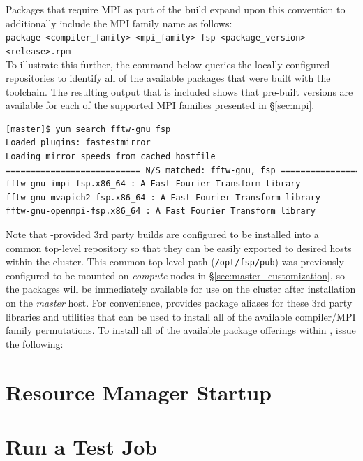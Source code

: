 \documentclass[letterpaper]{article}
\begin{document}
\noindent Packages that require MPI as part of the build expand upon this convention to
additionally include the MPI family name as follows: \\

\noindent
\texttt{package-<compiler\_family>-<mpi\_family>-fsp-<package\_version>-<release>.rpm} \\

To illustrate this further, the command below queries the locally configured
repositories to identify all of the available \FFTW{} packages that were built
with the \GNU{} toolchain. The resulting output that is included shows that
pre-built versions are available for each of the supported MPI families
presented in \S\ref{sec:mpi}.

\begin{lstlisting}[language=bash]
[master]$ yum search fftw-gnu fsp
Loaded plugins: fastestmirror
Loading mirror speeds from cached hostfile
=========================== N/S matched: fftw-gnu, fsp ===========================
fftw-gnu-impi-fsp.x86_64 : A Fast Fourier Transform library
fftw-gnu-mvapich2-fsp.x86_64 : A Fast Fourier Transform library
fftw-gnu-openmpi-fsp.x86_64 : A Fast Fourier Transform library
\end{lstlisting}

Note that \FSP{}-provided 3rd party builds are configured to be installed
into a common top-level repository so that they can be easily exported to
desired hosts within the cluster. This common top-level path
(\texttt{/opt/fsp/pub}) was previously configured to be mounted on {\em
  compute} nodes in \S\ref{sec:master_customization}, so the packages will be
immediately available for use on the cluster after installation on the {\em
  master} host.  For convenience, \FSP{} provides package aliases for these 3rd
party libraries and utilities that can be used to install all of the available
compiler/MPI family permutations. To install all of the available package
offerings within \FSP{}, issue the following:




\vspace*{0.2cm}

\section{Resource Manager Startup} \label{sec:rms_startup}


\section{Run a Test Job} \label{sec:test_job}



\end{document}
